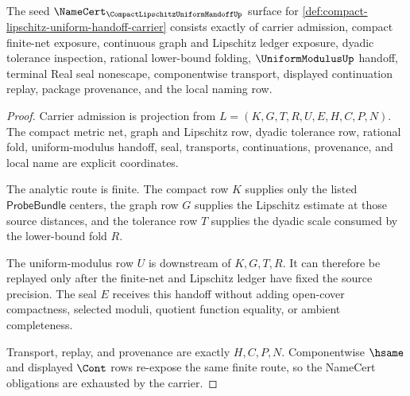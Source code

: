 \begin{theorem}
\label{thm:compact-lipschitz-uniform-handoff-namecert-obligations}
The seed $\NameCert_{\CompactLipschitzUniformHandoffUp}$ surface for \autoref{def:compact-lipschitz-uniform-handoff-carrier} consists exactly of carrier admission, compact finite-net exposure, continuous graph and Lipschitz ledger exposure, dyadic tolerance inspection, rational lower-bound folding, $\UniformModulusUp$ handoff, terminal Real seal nonescape, componentwise transport, displayed continuation replay, package provenance, and the local naming row.
\end{theorem}
\begin{proof}
Carrier admission is projection from $L=(K,G,T,R,U,E,H,C,P,N)$. The compact metric net, graph and Lipschitz row, dyadic tolerance row, rational fold, uniform-modulus handoff, seal, transports, continuations, provenance, and local name are explicit coordinates.

The analytic route is finite. The compact row $K$ supplies only the listed $\mathsf{ProbeBundle}$ centers, the graph row $G$ supplies the Lipschitz estimate at those source distances, and the tolerance row $T$ supplies the dyadic scale consumed by the lower-bound fold $R$.

The uniform-modulus row $U$ is downstream of $K,G,T,R$. It can therefore be replayed only after the finite-net and Lipschitz ledger have fixed the source precision. The seal $E$ receives this handoff without adding open-cover compactness, selected moduli, quotient function equality, or ambient completeness.

Transport, replay, and provenance are exactly $H,C,P,N$. Componentwise $\hsame$ and displayed $\Cont$ rows re-expose the same finite route, so the NameCert obligations are exhausted by the carrier.
\end{proof}

